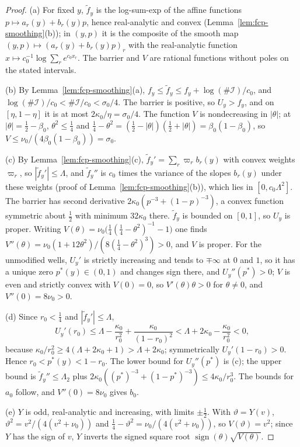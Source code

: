 \begin{proof}
(a) For fixed $y$, $\tilde f_y$ is the log-sum-exp of the affine functions $p\mapsto a_r(y)+b_r(y)p$, hence real-analytic and
convex (Lemma~\ref{lem:fcp-smoothing}(b)); in $(y,p)$ it is the composite of the smooth map
$(y,p)\mapsto(a_r(y)+b_r(y)p)_r$ with the real-analytic function $x\mapsto c_0^{-1}\log\sum_re^{c_0x_r}$. The barrier and $V$
are rational functions without poles on the stated intervals.

(b) By Lemma~\ref{lem:fcp-smoothing}(a), $f_y\le \tilde f_y\le f_y+\log(\#\mathcal I)/c_0$, and $\log(\#\mathcal I)/c_0<\#\mathcal I/c_0<\sigma_0/4$. The barrier is
positive, so $U_y>f_y$, and on $[\eta,1-\eta]$ it is at most $2\kappa_0/\eta=\sigma_0/4$. The function $V$ is nondecreasing in
$|\theta|$; at $|\theta|=\frac12-\beta_0$, $\theta^2\le\frac14$ and $\frac14-\theta^2=(\frac12-|\theta|)(\frac12+|\theta|)=\beta_0(1-\beta_0)$,
so $V\le\nu_0/(4\beta_0(1-\beta_0))=\sigma_0$.

(c) By Lemma~\ref{lem:fcp-smoothing}(c), $\tilde f_y'=\sum_r\varpi_rb_r(y)$ with convex weights $\varpi_r$, so $|\tilde f_y'|\le\Lambda$, and $\tilde f_y''$
is $c_0$ times the variance of the slopes $b_r(y)$ under these weights (proof of Lemma~\ref{lem:fcp-smoothing}(b)),
which lies in $[0,c_0\Lambda^2]$. The barrier has second derivative $2\kappa_0(p^{-3}+(1-p)^{-3})$, a convex function
symmetric about $\frac12$ with minimum $32\kappa_0$ there. $\tilde f_y$ is bounded on $[0,1]$, so $U_y$ is proper. Writing
$V(\theta)=\nu_0\bigl(\frac14(\frac14-\theta^2)^{-1}-1\bigr)$ one finds $V''(\theta)=\nu_0(1+12\theta^2)/(8(\frac14-\theta^2)^3)>0$, and $V$ is
proper. For the unmodified wells, $U_y'$ is strictly increasing and
tends to $\mp\infty$ at $0$ and $1$, so it has a unique zero $p^*(y)\in(0,1)$ and changes sign there, and $U_y''(p^*)>0$;
$V$ is even and strictly convex with $V(0)=0$, so $V'(\theta)\theta>0$ for $\theta\ne0$, and $V''(0)=8\nu_0>0$.

(d) Since $r_0<\frac14$ and $|\tilde f_y'|\le\Lambda$,
\[
 U_y'(r_0)\le\Lambda-\frac{\kappa_0}{r_0^2}+\frac{\kappa_0}{(1-r_0)^2}<\Lambda+2\kappa_0-\frac{\kappa_0}{r_0^2}<0,
\]
because $\kappa_0/r_0^2\ge4(\Lambda+2\kappa_0+1)>\Lambda+2\kappa_0$; symmetrically $U_y'(1-r_0)>0$. Hence
$r_0<p^*(y)<1-r_0$. The lower bound for $U_y''(p^*)$ is (c); the upper bound is $\tilde f_y''\le\Lambda_2$ plus
$2\kappa_0((p^*)^{-3}+(1-p^*)^{-3})\le4\kappa_0/r_0^3$. The bounds for $a_0$ follow, and $V''(0)=8\nu_0$ gives $b_0$.

(e) $Y$ is odd, real-analytic and increasing, with limits $\pm\frac12$. With $\vartheta=Y(v)$,
$\vartheta^2=v^2/(4(v^2+\nu_0))$ and $\frac14-\vartheta^2=\nu_0/(4(v^2+\nu_0))$, so $V(\vartheta)=v^2$; since $Y$ has the sign of $v$,
$Y$ inverts the signed square root $\operatorname{sign}(\theta)\sqrt{V(\theta)}$.


\end{proof}
